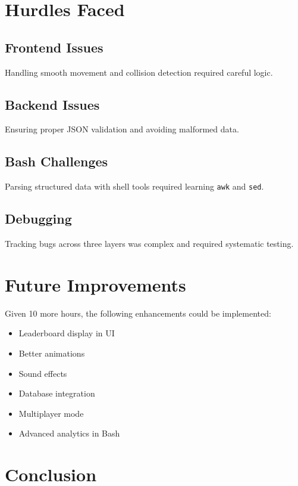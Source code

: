 \documentclass[12pt]{article}
\begin{document}
\section{Hurdles Faced}

\subsection{Frontend Issues}
Handling smooth movement and collision detection required careful logic.

\subsection{Backend Issues}
Ensuring proper JSON validation and avoiding malformed data.

\subsection{Bash Challenges}
Parsing structured data with shell tools required learning \texttt{awk} and \texttt{sed}.

\subsection{Debugging}
Tracking bugs across three layers was complex and required systematic testing.

\section{Future Improvements}

Given 10 more hours, the following enhancements could be implemented:

\begin{itemize}
    \item Leaderboard display in UI
    \item Better animations
    \item Sound effects
    \item Database integration
    \item Multiplayer mode
    \item Advanced analytics in Bash
\end{itemize}

\section{Conclusion}
\end{document}
